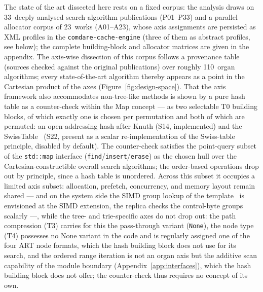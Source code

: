\begin{nurlang}
The state of the art dissected here rests on a fixed corpus: the analysis draws on
33~deeply analysed search-algorithm publications (P01--P33) and a parallel
allocator corpus of 23~works (A01--A23), whose axis assignments are persisted as XML profiles in the
\texttt{comdare-cache-engine} (three of them as abstract profiles, see below); the
complete building-block and allocator matrices are given in the appendix. The axis-wise dissection of this corpus
follows a provenance table (sources checked against the original publications) over
roughly 110~organ algorithms; every
state-of-the-art algorithm thereby appears as a point in the Cartesian product of the axes
(Figure~\ref{fig:design-space}). That the axis framework also accommodates non-tree-like methods is shown by
a pure hash table as a counter-check within the Map concept --- as two selectable
T0 building blocks, of which exactly one is chosen per permutation and both of which are permuted: an
open-addressing hash after Knuth (S14, implemented) and the SwissTable~\cite{abseil_swisstable}
(S22, present as a scalar re-implementation of the Swiss-table principle, disabled by
default). The counter-check satisfies the point-query subset of the
\texttt{std::map} interface (\texttt{find}/\texttt{insert}/\texttt{erase}) as the chosen hull over the Cartesian-constructible overall search algorithms; the order-based
operations drop out by principle, since a hash table is unordered. Across this subset it occupies
a limited axis subset: allocation, prefetch, concurrency, and memory layout remain
shared --- and on the system side the SIMD group lookup of the
template~\cite{abseil_swisstable} is envisioned at the SIMD extension, the replica checks the
control-byte groups scalarly ---,
while the tree- and trie-specific axes do not drop out: the path compression (T3) carries for this
the pass-through variant (\texttt{None}), the node type (T4) possesses no None variant in the code and is
regularly assigned one of the four ART node formats, which the hash building block does not use for its search,
and the ordered range iteration is not an organ axis but the additive scan capability of the
module boundary (Appendix~\ref{app:interfaces}), which the hash building block does not offer; the counter-check
thus requires no concept of its own.
\end{nurlang}
